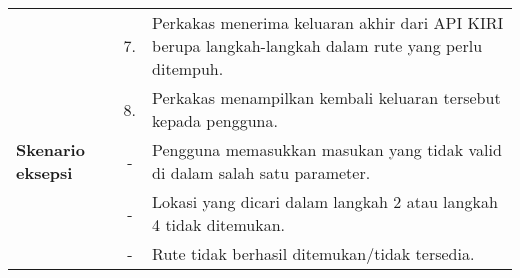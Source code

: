\begin{longtable}{| l | c p{10cm} |}
		 & 7. & Perkakas menerima keluaran akhir dari API KIRI berupa langkah-langkah dalam rute yang perlu ditempuh. \\
		 & 8. & Perkakas menampilkan kembali keluaran tersebut kepada pengguna. \\
	\hline
		\textbf{Skenario eksepsi} & - & Pengguna memasukkan masukan yang tidak valid di dalam salah satu parameter. \\
		 & - & Lokasi yang dicari dalam langkah 2 atau langkah 4 tidak ditemukan. \\
		 & - & Rute tidak berhasil ditemukan/tidak tersedia. \\
\end{longtable}
